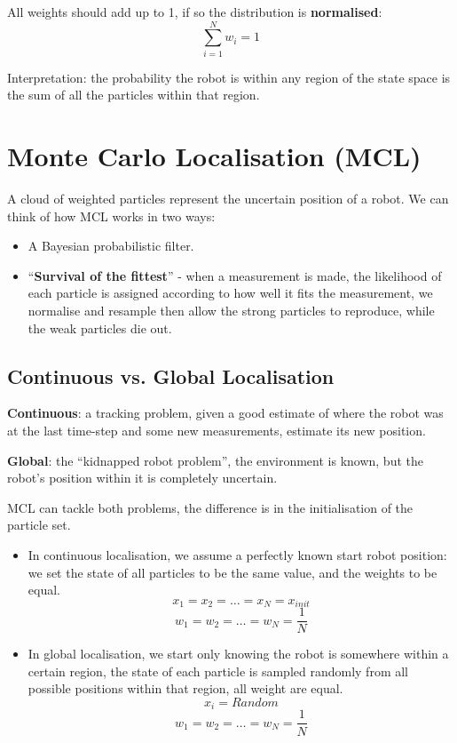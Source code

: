 \documentclass[11pt]{article}
\begin{document}
All weights should add up to 1, if so the distribution is \textbf{normalised}:
\[
  \sum_{i = 1}^N w_i = 1
\]

Interpretation: the probability the robot is within any region of the state space is the sum of all the particles within that region.

\section{Monte Carlo Localisation (MCL)}
A cloud of weighted particles represent the uncertain position of a robot.
We can think of how MCL works in two ways:
\begin{itemize}
  \item A Bayesian probabilistic filter.
  \item ``\textbf{Survival of the fittest}'' - when a measurement is made, the likelihood of each particle is assigned according to how well it fits the measurement, we normalise and resample then allow the strong particles to reproduce, while the weak particles die out. 
\end{itemize}

\subsection{Continuous vs. Global Localisation}
\textbf{Continuous}: a tracking problem, given a good estimate of where the robot was at the last time-step and some new measurements, estimate its new position.

\textbf{Global}: the ``kidnapped robot problem'', the environment is known, but the robot's position within it is completely uncertain.

MCL can tackle both problems, the difference is in the initialisation of the particle set.

\begin{itemize}
  \item In continuous localisation, we assume a perfectly known start robot position: we set the state of all particles to be the same value, and the weights to be equal.
    \[
      x_1 = x_2 = \ldots = x_N = x_{init}
    \]
    \[
      w_1 = w_2 = \ldots = w_N = \frac{1}{N}
    \]
  \item In global localisation, we start only knowing the robot is somewhere within a certain region, the state of each particle is sampled randomly from all possible positions within that region, all weight are equal.
    \[
      x_i = Random
    \]
    \[
      w_1 = w_2 = \ldots = w_N = \frac{1}{N}
    \]
\end{itemize}
\end{document}
